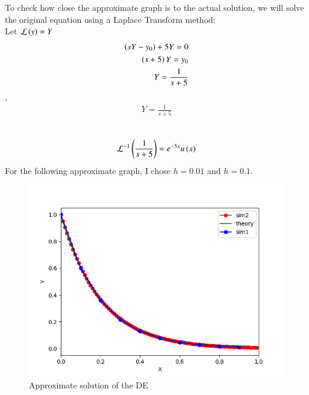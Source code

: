 \documentclass[journal]{IEEEtran}
\begin{document}
To check how close the approximate graph is to the actual solution, we will solve the original 
equation using a Laplace Transform method:\\
Let $\mathcal{L}\left(y\right) = Y$\\
\begin{align}
    \left(sY - y_0\right) +5Y = 0\\
    \left(s + 5\right)Y = y_0\\
    Y = \frac{1}{s + 5}\\
\end{align}
    ,\\
\begin{align}
    Y = \frac{1}{s + 5}\\
\end{align}
    \\
\begin{align}
    \mathcal{L}^{-1}\left(\frac{1}{s+5}\right) = e^{-5x}u\left(x\right)
\end{align}
For the following approximate graph, I chose $h = 0.01$ and $h = 0.1$.
\begin{figure}[h!]
   \centering
   \includegraphics[width=0.7\columnwidth]{figs/fig.png}
    \caption{Approximate solution of the DE}
\end{figure}
\end{document}
